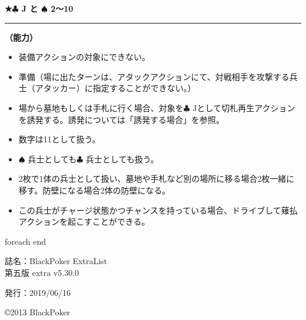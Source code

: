\documentclass[twocolumn,a5paper,papersize,10pt]{jarticle}
\begin{document}
\vspace{2mm}
\begin{tcolorbox}[title={\small\bf【Character】騎士}{\scriptsize （兵士）}]

  {\scriptsize\bf ★{\normalsize $\clubsuit$} J と {\normalsize $\spadesuit$} 2〜10}

\vspace{1mm} %
\hrule height 0.1mm depth 0mm width 62mm %
\vspace{1mm} %

{\bf（能力）}


\vspace{-1zh}%
\begin{itemize}
\setlength{\leftskip}{-0.3cm}
\setlength{\parskip}{0pt} %

\item 装備アクションの対象にできない。

\item 準備（場に出たターンは、アタックアクションにて、対戦相手を攻撃する兵士（アタッカー）に指定することができない。）

\item 場から墓地もしくは手札に行く場合、対象を{\normalsize $\clubsuit$} Jとして切札再生アクションを誘発する。誘発については「誘発する場合」を参照。

\item 数字は11として扱う。

\item {\normalsize $\spadesuit$} 兵士としても{\normalsize $\clubsuit$} 兵士としても扱う。

\item 2枚で1体の兵士として扱い、墓地や手札など別の場所に移る場合2枚一緒に移す。防壁になる場合2体の防壁になる。

\item この兵士がチャージ状態かつチャンスを持っている場合、ドライブして薙払アクションを起こすことができる。
\vspace{-1zh}%
\end{itemize}

\vspace{1mm} %
\end{tcolorbox}

\vspace{-1zh}
 foreach end
 
 
\thispagestyle{empty}
\begin{flushright}
\begin{minipage}{0.6\hsize}
\begin{description}
  \item{誌名：}BlackPoker ExtraList\\ \hspace{3pt} 第五版 extra v5.30.0
  \item{発行：}2019/06/16
\end{description}
\end{minipage}
\end{flushright}

\begin{flushright}
\copyright 2013 BlackPoker
\end{flushright}
\end{document}
